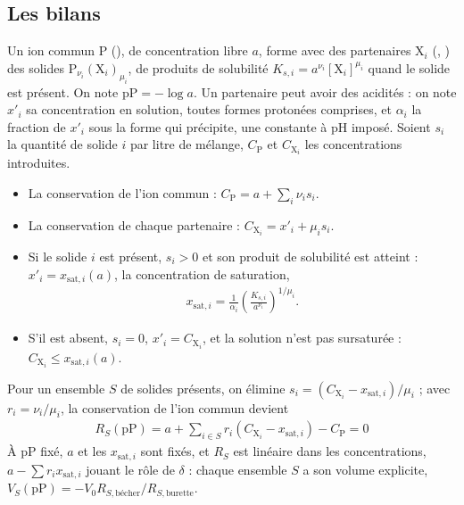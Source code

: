 \documentclass[a4paper,11pt]{article}
\newcommand\rsltm[1]{\boxed{#1}}
\newcommand\pH{\ensuremath{\mathrm{pH}}\xspace}
\newcommand\pP{\ensuremath{\mathrm{pP}}\xspace}
\newcommand\pare[1]{\left(#1\right)}
\begin{document}
\subsection{Les bilans}
Un ion commun P (), de concentration libre $a$, forme avec des partenaires $\mathrm X_i$ (, ) des solides $\mathrm P_{\nu_i}(\mathrm X_i)_{\mu_i}$, de produits de solubilité $K_{s,i}=a^{\nu_i}[\mathrm X_i]^{\mu_i}$ quand le solide est présent.
On note $\pP=-\log a$.
Un partenaire peut avoir des acidités : on note $x'_i$ sa concentration en solution, toutes formes protonées comprises, et $\alpha_i$ la fraction de $x'_i$ sous la forme qui précipite, une constante à \pH imposé.
Soient $s_i$ la quantité de solide $i$ par litre de mélange, $C_\mathrm P$ et $C_{\mathrm X_i}$ les concentrations introduites.
\begin{itemize}
\item La conservation de l'ion commun : $C_\mathrm P=a+\sum_i\nu_is_i$.
\item La conservation de chaque partenaire : $C_{\mathrm X_i}=x'_i+\mu_is_i$.
\item Si le solide $i$ est présent, $s_i>0$ et son produit de solubilité est atteint : $x'_i=x_{\text{sat},i}(a)$, la concentration de saturation,
\begin{align}
x_{\text{sat},i}=\frac1{\alpha_i}\pare{\frac{K_{s,i}}{a^{\nu_i}}}^{1/\mu_i}.
\end{align}
\item S'il est absent, $s_i=0$, $x'_i=C_{\mathrm X_i}$, et la solution n'est pas sursaturée : $C_{\mathrm X_i}\le x_{\text{sat},i}(a)$.
\end{itemize}
Pour un ensemble $S$ de solides présents, on élimine $s_i=\pare{C_{\mathrm X_i}-x_{\text{sat},i}}/\mu_i$ ; avec $r_i=\nu_i/\mu_i$, la conservation de l'ion commun devient
\begin{align}
\rsltm{R_S(\pP)=a+\sum_{i\in S}r_i\pare{C_{\mathrm X_i}-x_{\text{sat},i}}-C_\mathrm P=0}
\end{align}
À \pP fixé, $a$ et les $x_{\text{sat},i}$ sont fixés, et $R_S$ est linéaire dans les concentrations, $a-\sum r_ix_{\text{sat},i}$ jouant le rôle de $\delta$ : chaque ensemble $S$ a son volume explicite, $V_S(\pP)=-V_0R_{S,\text{bécher}}/R_{S,\text{burette}}$.
\end{document}
